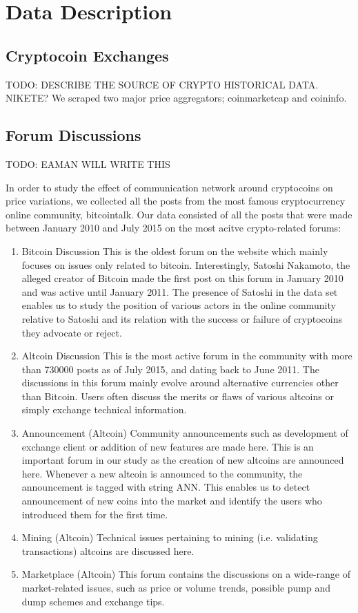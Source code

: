 \section{Data Description}

\subsection{Cryptocoin Exchanges}
TODO: DESCRIBE THE SOURCE OF CRYPTO HISTORICAL DATA. NIKETE?
We scraped two major price aggregators; coinmarketcap and coininfo.

\subsection{Forum Discussions}
TODO: EAMAN WILL WRITE THIS

In order to study the effect of communication network around cryptocoins on
price variations, we collected all the posts from the most famous cryptocurrency
online community, bitcointalk.  Our data consisted of all the posts that were
made between January 2010 and July 2015 on the most acitve crypto-related forums:
\begin{enumerate}
  \item{Bitcoin Discussion} This is the oldest forum on the website which mainly focuses
    on issues only related to bitcoin. Interestingly, Satoshi Nakamoto, the alleged
    creator of Bitcoin made the first post on this forum in January 2010 and
    was active until January 2011. The presence of Satoshi in the data set enables us
    to study the position of various actors in the online community relative to Satoshi
    and its relation with the success or failure of cryptocoins they advocate or reject.

  \item{Altcoin Discussion} This is the most active forum in the community
    with more than 730000 posts as of July 2015, and dating back to June 2011.
    The discussions in this forum mainly evolve around alternative currencies
    other than Bitcoin. Users often discuss the merits or flaws of various
    altcoins or simply exchange technical information.
  
  \item{Announcement (Altcoin)} Community announcements such as development of 
    exchange client or addition of new features are made here. This is an important forum
    in our study as the creation of new altcoins are announced here. Whenever a new
    altcoin is announced to the community, the announcement is tagged with string ANN.
    This enables us to detect announcement of new coins into the market and identify
    the users who introduced them for the first time.

  \item{Mining (Altcoin)} Technical issues pertaining to mining (i.e. validating transactions)
    altcoins are discussed here.
  \item{Marketplace (Altcoin)} This forum contains the discussions on a wide-range of 
    market-related issues, such as price or volume trends, possible pump and dump schemes
    and exchange tips.

\end{enumerate}


